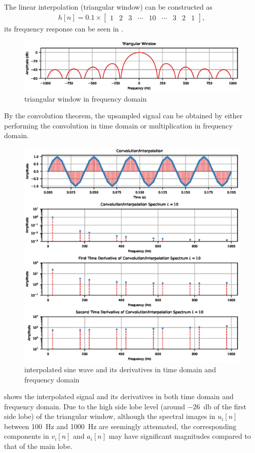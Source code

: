 The linear interpolation (triangular window) can be constructed as
\begin{gather}
h[n]=0.1\times\begin{bmatrix}
1&2&3&\cdots&10&\cdots&3&2&1
\end{bmatrix},
\end{gather}
its frequency response can be seen in .
\begin{figure}[ht]
\centering
\includegraphics{PIC/TriangularWindow}
\caption{triangular window in frequency domain}\label{fig:tri_window}
\end{figure}

By the convolution theorem, the upsampled signal can be obtained by either performing the convolution in time domain or multiplication in frequency domain.
\begin{figure}[ht]
\centering
\includegraphics{PIC/Convolution}
\caption{interpolated sine wave and its derivatives in time domain and frequency domain}\label{fig:interpolated}
\end{figure}
 shows the interpolated signal and its derivatives in both time domain and frequency domain. Due to the high side lobe level (around \SI{-26}{\decibel} of the first side lobe) of the triangular window, although the spectral images in $u_i[n]$ between \SI{100}{\hertz} and \SI{1000}{\hertz} are seemingly attenuated, the corresponding components in $v_i[n]$ and $a_i[n]$ may have significant magnitudes compared to that of the main lobe.

